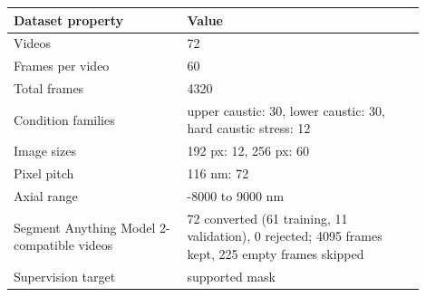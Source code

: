 \begin{tabular}{p{0.38\linewidth}p{0.52\linewidth}}
\toprule
Dataset property & Value \\
\midrule
Videos & 72 \\
Frames per video & 60 \\
Total frames & 4320 \\
Condition families & upper caustic: 30, lower caustic: 30, hard caustic stress: 12 \\
Image sizes & 192 px: 12, 256 px: 60 \\
Pixel pitch & 116 nm: 72 \\
Axial range & -8000 to 9000 nm \\
Segment Anything Model 2-compatible videos & 72 converted (61 training, 11 validation), 0 rejected; 4095 frames kept, 225 empty frames skipped \\
Supervision target & supported mask \\
\bottomrule
\end{tabular}
